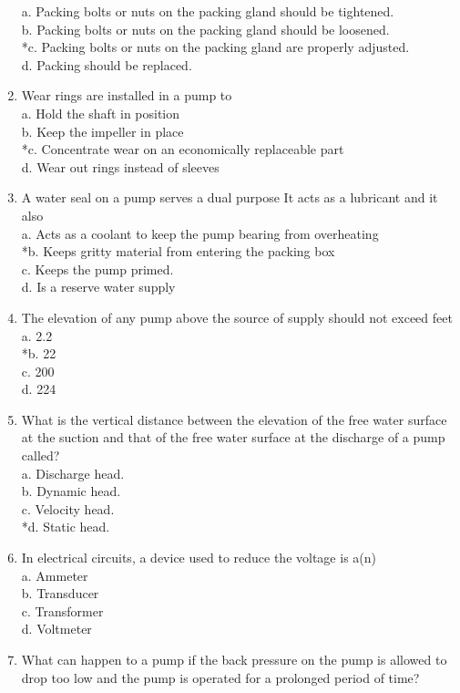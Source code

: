 \begin{enumerate}[1.]
a. Packing bolts or nuts on the packing gland should be tightened.\\
b. Packing bolts or nuts on the packing gland should be loosened.\\
*c. Packing bolts or nuts on the packing gland are properly adjusted.\\
d. Packing should be replaced.\\
\item Wear rings are installed in a pump to\\
a. Hold the shaft in position\\
b. Keep the impeller in place\\
*c. Concentrate wear on an economically replaceable part\\
d. Wear out rings instead of sleeves\\
\item A water seal on a pump serves a dual purpose It acts as a lubricant and it also\\
a. Acts as a coolant to keep the pump bearing from overheating\\
*b. Keeps gritty material from entering the packing box\\
c. Keeps the pump primed.\\
d. Is a reserve water supply\\
\item The elevation of any pump above the source of supply should not exceed feet\\
a. 2.2\\
*b. 22\\
c. 200\\
d. 224\\
\item What is the vertical distance between the elevation of the free water surface at the suction and that of the free water surface at the discharge of a pump called?\\
a. Discharge head.\\
b. Dynamic head.\\
c. Velocity head.\\
*d. Static head.\\
\item In electrical circuits, a device used to reduce the voltage is a(n)\\
a. Ammeter\\
b. Transducer\\
c. Transformer\\
d. Voltmeter\\
\item What can happen to a pump if the back pressure on the pump is allowed to drop too low and the pump is operated for a prolonged period of time?\\

\end{enumerate}
